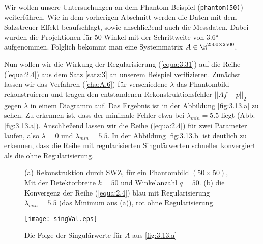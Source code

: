 Wir wollen unsere Untersuchungen an dem Phantom-Beispiel (\verb|phantom(50)|) weiterführen. Wie in dem vorherigen Abschnitt werden die Daten mit dem Salzstreuer-Effekt beaufschlagt, sowie anschließend auch die Messdaten. Dabei wurden die Projektionen für 50 Winkel mit der Schrittweite von 3.6° aufgenommen. Folglich bekommt man eine Systemmatrix $A \in \R^{2500 \times 2500}$.

Nun wollen wir die Wirkung der Regularisierung (\ref{equa:3.31}) auf die Reihe (\ref{equa:2.4}) aus dem Satz \ref{satz:3} an unserem Beispiel verifizieren. Zunächst lassen wir das Verfahren (\ref{cha:A.6}) für verschiedene $\lambda$ das Phantombild rekonstruieren und tragen den entstandenen Rekonstruktionsfehler $||A\tilde{f} - p ||_2$ gegen $\lambda$ in einem Diagramm auf. Das Ergebnis ist in der Abbildung \ref{fig:3.13.a} zu sehen. Zu erkennen ist, dass der minimale Fehler etwa bei $\lambda_{min} = 5.5$ liegt (Abb. \ref{fig:3.13.a}). Anschließend lassen wir die Reihe (\ref{equa:2.4}) für zwei Parameter laufen, also $\lambda = 0$ und $\lambda_{min} = 5.5$. In der Abbildung \ref{fig:3.13.b} ist deutlich zu erkennen, dass die Reihe mit regularisierten Singulärwerten schneller konvergiert als die ohne Regularisierung.
\begin{figure}[!h]
	\begin{center}
	\end{center}
	\caption{(a) Rekonstruktion durch SWZ, für ein Phantombild $(50\times50)$, Mit der Detektorbreite $k = 50$ und Winkelanzahl $q = 50$. (b) die  Konvergenz der Reihe (\ref{equa:2.4}) blau mit Regularisierung $\lambda_{min} = 5.5$ (das Minimum aus (a)), rot ohne Regularisierung.}
	\label{fig:3.13}
\end{figure}

\begin{figure}[!h]
	\centering
	\texttt{[image: singVal.eps]}
	\caption{Die Folge der Singulärwerte für $A$ aus \ref{fig:3.13.a}}
	\label{fig:3.14}
\end{figure}

